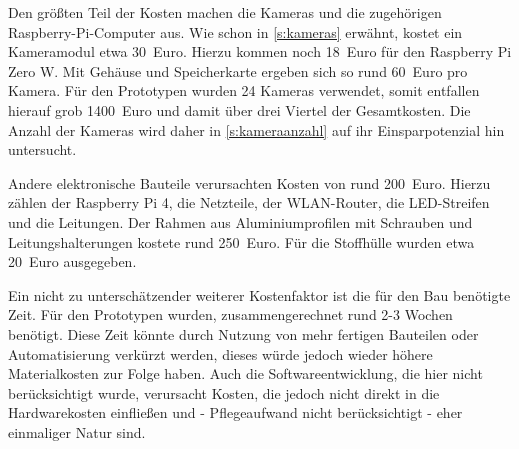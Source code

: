 \documentclass[./00PhotoBox.tex]{subfiles}
\begin{document}
Den größten Teil der Kosten machen die Kameras und die zugehörigen Raspberry-Pi-Computer aus. Wie schon in \autoref{s:kameras} erwähnt, kostet ein Kameramodul etwa \SI{30}{Euro}. Hierzu kommen noch \SI{18}{Euro} für den Raspberry Pi Zero W. Mit Gehäuse und Speicherkarte ergeben sich so rund \SI{60}{Euro} pro Kamera. Für den Prototypen wurden 24 Kameras verwendet, somit entfallen hierauf grob \SI{1400}{Euro} und damit über drei Viertel der Gesamtkosten. Die Anzahl der Kameras wird daher in \autoref{s:kameraanzahl} auf ihr Einsparpotenzial hin untersucht.

Andere elektronische Bauteile verursachten Kosten von rund \SI{200}{Euro}. Hierzu zählen der Raspberry Pi 4, die Netzteile, der WLAN-Router, die LED-Streifen und die Leitungen. Der Rahmen aus Aluminiumprofilen mit Schrauben und Leitungshalterungen kostete rund \SI{250}{Euro}. Für die Stoffhülle wurden etwa \SI{20}{Euro} ausgegeben.

Ein nicht zu unterschätzender weiterer Kostenfaktor ist die für den Bau benötigte Zeit. Für den Prototypen wurden, zusammengerechnet rund 2-3 Wochen benötigt. Diese Zeit könnte durch Nutzung von mehr fertigen Bauteilen oder Automatisierung verkürzt werden, dieses würde jedoch wieder höhere Materialkosten zur Folge haben. Auch die Softwareentwicklung, die hier nicht berücksichtigt wurde, verursacht Kosten, die jedoch nicht direkt in die Hardwarekosten einfließen und - Pflegeaufwand nicht berücksichtigt -  eher einmaliger Natur sind.

\biblio
\end{document}
